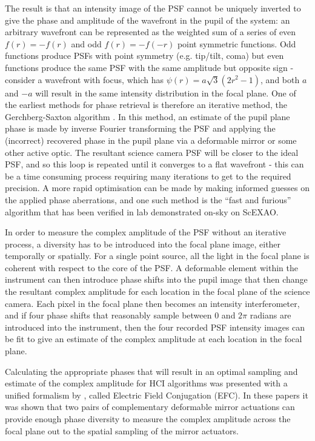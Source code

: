 \documentclass[letterpaper]{ar-1col}
\begin{document}
The result is that an intensity image of the PSF cannot be uniquely inverted to give the phase and amplitude of the wavefront in the pupil of the system: an arbitrary wavefront can be represented as the weighted sum of a series of even $f(r)=-f(r)$ and odd $f(r)=-f(-r)$ point symmetric functions.
%
Odd functions produce PSFs with point symmetry (e.g. tip/tilt, coma) but even functions produce the same PSF with the same amplitude but opposite sign - consider a wavefront with focus, which has $\psi(r) = a\sqrt{3}(2r^2-1)$, and both $a$ and $-a$ will result in the same intensity distribution in the focal plane.
%
One of the earliest methods for phase retrieval is therefore an iterative method, the Gerchberg-Saxton algorithm \citep{Gerchberg72}.
%
In this method, an estimate of the pupil plane phase is made by inverse Fourier transforming the PSF and applying the (incorrect) recovered phase in the pupil plane via a deformable mirror or some other active optic.
%
The resultant science camera PSF will be closer to the ideal PSF, and so this loop is repeated until it converges to a flat wavefront - this can be a time consuming process requiring many iterations to get to the required precision.
%
A more rapid optimisation can be made by making informed guesses on the applied phase aberrations\citep{Gonsalves02}, and one such method is the ``fast and furious'' algorithm \citep{Keller12} that has been verified in lab \citep{Wilby18} demonstrated on-sky \citep{Bos20} on ScEXAO. 

In order to measure the complex amplitude of the PSF without an iterative process, a diversity has to be introduced into the focal plane image, either temporally or spatially.
%
For a single point source, all the light in the focal plane is coherent with respect to the core of the PSF.
%
A deformable element within the instrument can then introduce phase shifts into the pupil image that then change the resultant complex amplitude for each location in the focal plane of the science camera.
%
Each pixel in the focal plane then becomes an intensity interferometer, and if four phase shifts that reasonably sample between $0$ and $2\pi$ radians are introduced into the instrument, then the four recorded PSF intensity images can be fit to give an estimate of the complex amplitude at each location in the focal plane.

Calculating the appropriate phases that will result in an optimal sampling and estimate of the complex amplitude for HCI algorithms was presented with a unified formalism by \citet{Giveon09,Giveon10}, called Electric Field Conjugation (EFC).
%
In these papers it was shown that two pairs of complementary deformable mirror actuations can provide enough phase diversity to measure the complex amplitude across the focal plane out to the spatial sampling of the mirror actuators.
\end{document}
